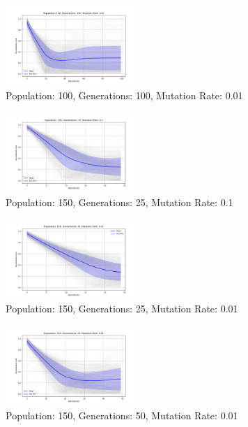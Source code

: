 \documentclass[
]{article}
\begin{document}
    \begin{figure}[H]
        \centering
        \includegraphics[width=0.45\textwidth]{genetic_algorithm/appendix/Population_100_Generations_100_MutationRate_0.01}
        \caption{Population: 100, Generations: 100, Mutation Rate: 0.01}
        \label{fig:app_ga_100_100_01}
    \end{figure}

    \begin{figure}[H]
        \centering
        \includegraphics[width=0.45\textwidth]{genetic_algorithm/appendix/Population_150_Generations_25_MutationRate_0.1}
        \caption{Population: 150, Generations: 25, Mutation Rate: 0.1}
        \label{fig:app_ga_150_25_1}
    \end{figure}

    \begin{figure}[H]
        \centering
        \includegraphics[width=0.45\textwidth]{genetic_algorithm/appendix/Population_150_Generations_25_MutationRate_0.01}
        \caption{Population: 150, Generations: 25, Mutation Rate: 0.01}
        \label{fig:app_ga_150_25_01}
    \end{figure}

    \begin{figure}[H]
        \centering
        \includegraphics[width=0.45\textwidth]{genetic_algorithm/appendix/Population_150_Generations_50_MutationRate_0.01}
        \caption{Population: 150, Generations: 50, Mutation Rate: 0.01}
        \label{fig:app_ga_150_50_01}
    \end{figure}
\end{document}
